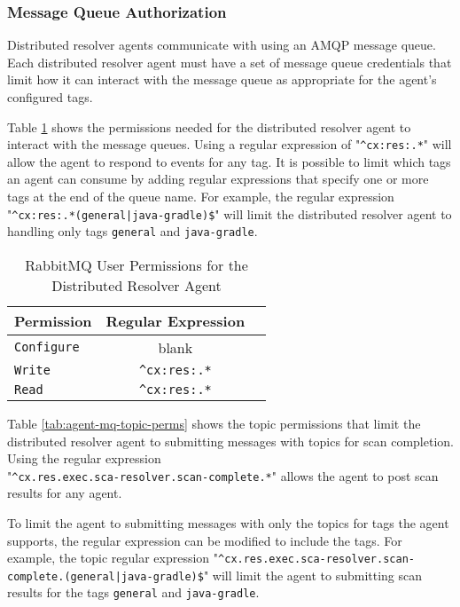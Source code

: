 \subsubsection{Message Queue Authorization}\label{sec:agent-mq-auth-req}

Distributed resolver agents communicate with \cxoneflow using an AMQP message queue. Each distributed
resolver agent must have a set of message queue credentials that limit how it can interact
with the message queue as appropriate for the agent's configured tags.

Table \ref{tab:agent-mq-user-perms} shows the permissions needed for the distributed resolver agent
to interact with the message queues.  Using a regular expression of "\texttt{\^{}cx:res:.*}" will allow
the agent to respond to events for any tag.  It is possible to limit which tags an agent can consume
by adding regular expressions that specify one or more tags at the end of the queue name.  For example, the
regular expression "\texttt{\^{}cx:res:.*(general|java-gradle)\$}" will limit the distributed resolver agent
to handling only tags \texttt{general} and \texttt{java-gradle}.

\begin{table}[ht]
  \caption{RabbitMQ User Permissions for the Distributed Resolver Agent}  
  \label{tab:agent-mq-user-perms}      
  \begin{tabularx}{\textwidth}{lcl}
      \toprule
      \textbf{Permission} & \textbf{Regular Expression} \\
      \midrule
      \texttt{Configure} & blank \\
      \midrule
      \texttt{Write} & \texttt{\^{}cx:res:.*} \\
      \midrule
      \texttt{Read} & \texttt{\^{}cx:res:.*} \\
      \midrule
      \bottomrule
  \end{tabularx}
\end{table}

Table \ref{tab:agent-mq-topic-perms} shows the topic permissions that limit the distributed resolver agent
to submitting messages with topics for scan completion.  Using the regular expression\\"\texttt{\^{}cx.res.exec.sca-resolver.scan-complete.*}"
allows the agent to post scan results for any agent.

To limit the agent to submitting messages with only the topics for tags the agent supports, the regular expression can
be modified to include the tags.  For example, the topic regular expression
"\texttt{\^{}cx.res.exec.sca-resolver.scan-complete.(general|java-gradle)\$}" will limit the agent to submitting
scan results for the tags \texttt{general} and \texttt{java-gradle}.

